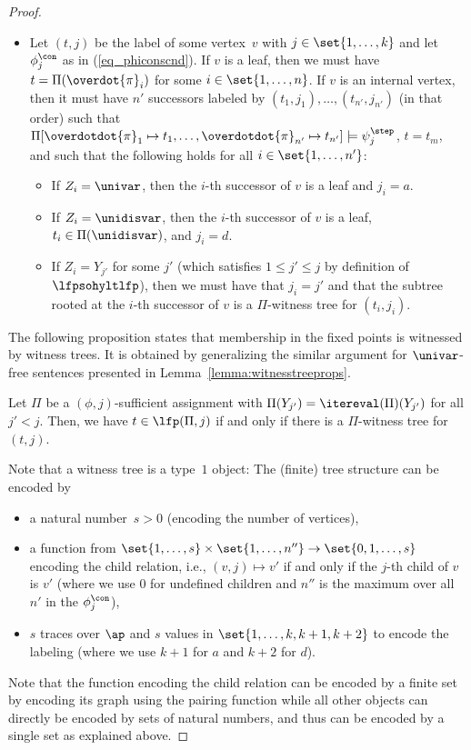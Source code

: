 \begin{proof}
\begin{itemize}
    \item Let $(t,j)$ be the label of some vertex~$v$ with $j \in \set{1,\ldots, k}$ and let $\phi_j^\con$ as in (\ref{eq_phiconscnd}).
If $v$ is a leaf, then we must have $t = \Pi(\overdot{\pi}_i)$ for some $i \in \set{1, \ldots, n}$.
If $v$ is an internal vertex, then it must have $n'$ successors labeled by $(t_1,j_1),\ldots,(t_{n'},j_{n'})$ (in that order) such that $\Pi[\overdotdot{\pi}_1 \mapsto t_1, \ldots, \overdotdot{\pi}_{n'} \mapsto t_{n'}] \models \psi^\step_j $, $t = t_m$, and
such that the following holds for all $i \in \set{1, \ldots, n'}$:
\begin{itemize}
    \item If $Z_i = \univar$, then the $i$-th successor of $v$ is a leaf and $j_i = a$.    
    
    \item If $Z_i = \unidisvar$, then the $i$-th successor of $v$ is a leaf, $t_i \in \Pi(\unidisvar)$, and $j_i = d$.
    
    \item If $Z_i = Y_{j'}$ for some $j'$ (which satisfies $1 \le j' \le j$ by definition of $\lfpsohyltlfp$), then we must have that $ j_i = j'$ and that the subtree rooted at the $i$-th successor of $v$ is a $\Pi$-witness tree for $(t_i,j_i)$.
\end{itemize}
\end{itemize}

The following proposition states that membership in the fixed points is witnessed by witness trees. It is obtained by generalizing the similar argument for $\univar$-free sentences presented in Lemma~\ref{lemma:witnesstreeprops}.

\begin{lem}
Let $\Pi$ be a $(\phi, j)$-sufficient assignment with $\Pi(Y_{j'}) = \itereval(\Pi)(Y_{j'})$ for all $j' < j$.
Then, we have $t \in \lfp(\Pi, j)$ if and only if there is a $\Pi$-witness tree for $(t,j)$.
\end{lem}

Note that a witness tree is a type~$1$ object: The (finite) tree structure can be encoded by 
\begin{itemize}
    \item a natural number~$s>0$ (encoding the number of vertices), 
    \item a function from $\set{1,\ldots, s} \times \set{1,\ldots, n''} \rightarrow \set{0,1,\ldots, s}$ encoding the child relation, i.e., $(v,j) \mapsto v'$ if and only if the $j$-th child of $v$ is $v'$ (where we use $0$ for undefined children and $n''$ is the maximum over all $n'$ in the $\phi_j^\con$), 
    \item $s$ traces over $\ap$ and $s$ values in $\set{1,\ldots, k, k+1, k+2}$ to encode the labeling (where we use $k+1$ for $a$ and $k+2$ for $d$).
\end{itemize}
Note that the function encoding the child relation can be encoded by a finite set by encoding its graph using the pairing function while all other objects can directly be encoded by sets of natural numbers, and thus can be encoded by a single set as explained above.


\end{proof}
